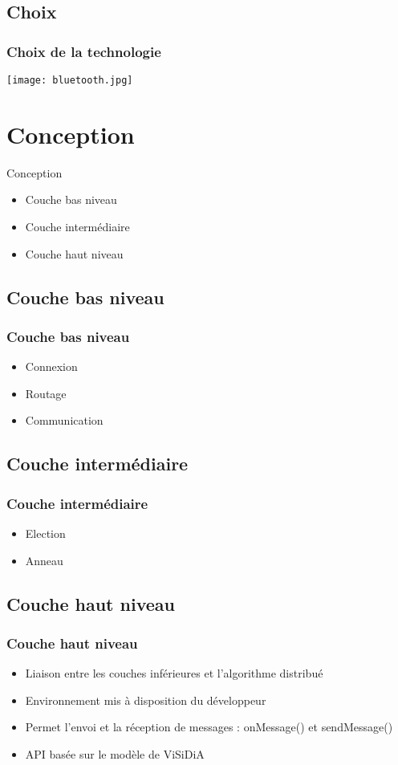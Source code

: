 \documentclass{beamer}
\begin{document}
      \subsection{Choix}
      \begin{frame}
	  \frametitle{Choix de la technologie}
	  \begin{center}
	     \texttt{[image: bluetooth.jpg]}
      \end{center}
      \end{frame}
    \section{Conception}
    \begin{frame}{Conception}
        \begin{itemize}
            \item Couche bas niveau
            \item Couche intermédiaire
            \item Couche haut niveau
        \end{itemize}
    \end{frame}
      \subsection{Couche bas niveau}
          \begin{frame}
    	    \frametitle{Couche bas niveau}
    	    \begin{itemize}
    	        \item Connexion
    	        \item Routage
    	        \item Communication
    	    \end{itemize}
          \end{frame}
      \subsection{Couche intermédiaire}
      \begin{frame}
	  \frametitle{Couche intermédiaire}
	  \begin{itemize}
	      \item Election
	      \item Anneau
	  \end{itemize}
      \end{frame}
      \subsection{Couche haut niveau}
      \begin{frame}
	  \frametitle{Couche haut niveau}
	  \begin{itemize}
	      \item Liaison entre les couches inférieures et l'algorithme distribué
	      \item Environnement mis à disposition du développeur
	      \item Permet l'envoi et la réception de messages : onMessage() et sendMessage()
	      \item API basée sur le modèle de ViSiDiA
	  \end{itemize}
      \end{frame}
\end{document}
